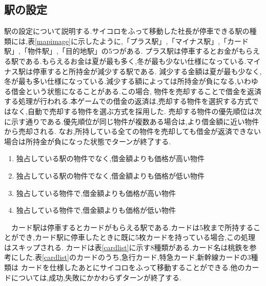 \documentclass[a4j]{jarticle}
\begin{document}
    \subsection{駅の設定}
    駅の設定について説明する.サイコロをふって移動した社長が停車できる駅の種類には,表\ref{mapimage}に示したように,「プラス駅」,「マイナス駅」,「カード駅」,「物件駅」,「目的地駅」の5つがある.
    プラス駅は停車するとお金がもらえる駅である.もらえるお金は夏が最も多く,冬が最も少ない仕様になっている.マイナス駅は停車すると所持金が減少する駅である.
    減少する金額は夏が最も少なく,冬が最も多い仕様になっている.減少する額によっては所持金が負になる,いわゆる借金という状態になることがある.この場合,
    物件を売却することで借金を返済する処理が行われる.本ゲームでの借金の返済は,売却する物件を選択する方式ではなく,自動で売却する物件を選ぶ方式を採用した.
    売却する物件の優先順位は次に示す通りである.優先順位が同じ物件が複数ある場合は,より借金額に近い物件から売却される.
    なお,所持している全ての物件を売却しても借金が返済できない場合は所持金が負になった状態でターンが終了する.
    \begin{enumerate}
        \item 独占している駅の物件でなく,借金額よりも価格が高い物件
        \item 独占している駅の物件でなく,借金額よりも価格が低い物件
        \item 独占している物件で,借金額よりも価格が高い物件
        \item 独占している物件で,借金額よりも価格が低い物件
    \end{enumerate}
    　カード駅は停車するとカードがもらえる駅である.カードは5枚まで所持することができ,カード駅に停車したときに既に5枚カードを持っている場合,この処理はスキップされる.
    カードは表\ref{cardlist}に示す8種類がある.カード名は桃鉄を参考にした.表\ref{cardlist}のカードのうち,急行カード,特急カード,新幹線カードの3種類は
    カードを仕様したあとにサイコロをふって移動することができる.他のカードについては,成功,失敗にかかわらずターンが終了する.
\end{document}
